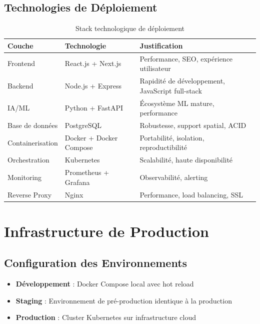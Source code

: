 \subsection{Technologies de Déploiement}

\begin{table}[H]
\centering
\caption{Stack technologique de déploiement}
\begin{tabular}{|l|l|l|}
\hline
\textbf{Couche} & \textbf{Technologie} & \textbf{Justification} \\
\hline
Frontend & React.js + Next.js & Performance, SEO, expérience utilisateur \\
Backend & Node.js + Express & Rapidité de développement, JavaScript full-stack \\
IA/ML & Python + FastAPI & Écosystème ML mature, performance \\
Base de données & PostgreSQL & Robustesse, support spatial, ACID \\
Containerisation & Docker + Docker Compose & Portabilité, isolation, reproductibilité \\
Orchestration & Kubernetes & Scalabilité, haute disponibilité \\
Monitoring & Prometheus + Grafana & Observabilité, alerting \\
Reverse Proxy & Nginx & Performance, load balancing, SSL \\
\hline
\end{tabular}
\label{tab:stack_technologique}
\end{table}

\section{Infrastructure de Production}

\subsection{Configuration des Environnements}

\begin{itemize}
    \item \textbf{Développement} : Docker Compose local avec hot reload
    \item \textbf{Staging} : Environnement de pré-production identique à la production
    \item \textbf{Production} : Cluster Kubernetes sur infrastructure cloud
\end{itemize}


